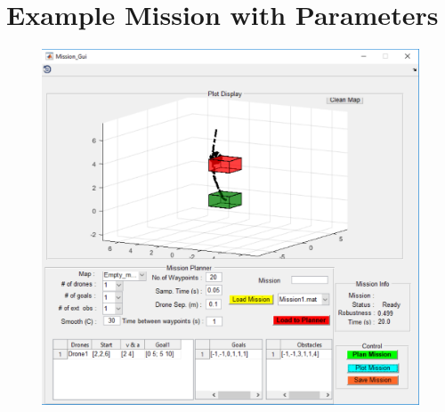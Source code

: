 \documentclass[english]{article}
\begin{document}
\section{Example Mission with Parameters}
\begin{figure}[H]
        \centering
        \includegraphics[scale=0.6]{example.pdf}
    \end{figure}
\end{document}
